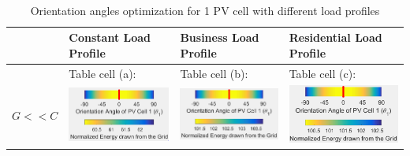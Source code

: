 \begin{table}[H] 
 \centering
\leftskip=-2cm
\captionsetup{justification=centering}
\caption{\\ Orientation angles optimization for 1 PV cell with different load profiles \label{table_1PV}}
  \begin{tabular}
      {@{ }m{}@{ }||@{ }M{0.35\columnwidth}@{ }|@{ }M{0.35\columnwidth}@{ }|@{ }M{0.35\columnwidth}@{ }} 
			&  Constant Load Profile &  Business Load Profile & Residential Load Profile \\
			
			\hline\hline 
			   &  Table cell (a): & Table cell (b): &  Table cell (c): \\
			
      $G<<C$ &  \vspace{0.1cm}  \includegraphics[scale=0.45]{pictures/results/rein_1PV_scale1_offset1_con}  & \vspace{0.1cm} \includegraphics[scale=0.45]{pictures/results/rein_1PV_scale1_offset1_bis}  & \vspace{0.1cm} \includegraphics[scale=0.45]{pictures/results/rein_1PV_scale1_offset1_res} \\
			

\end{tabular}
\end{table}
